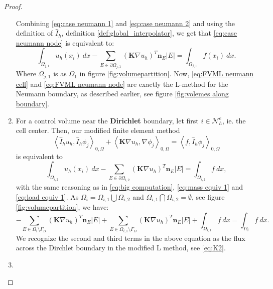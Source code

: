 \documentclass[../Main/main.tex]{subfiles}
\begin{document}
\begin{proof}
\begin{enumerate}
			Combining \eqref{eq:case neumann 1} and \eqref{eq:case neumann 2} and using the definition of $\hat{I}_h$, definition \ref{def:global_interpolator}, we get that \eqref{eq:case neumann node} is equivalent to:
			\begin{equation}\label{eq:FVML neumann node}
				\int_{\Omega_{j,1}}u_h(x_i) \ dx - \sum_{E\in \partial \Omega_{j,1}} (\bm{K}\nabla u_h)^T\bm{n}_E |E| = \int_{\Omega_{j,1}}f(x_i) \ dx.
			\end{equation}
			Where $\Omega_{j,1}$ is as $\Omega_1$ in figure \ref{fig:volumepartition}. Now, \eqref{eq:FVML neumann cell} and \eqref{eq:FVML neumann node} are exactly the L-method for the Neumann boundary, as described earlier, see figure \ref{fig:volemes along boundary}.  
			\item For a control volume near the \textbf{Dirichlet} boundary, let first $i\in \mathcal{N}_h^e$, ie. the cell center. Then, our modified finite element method
			\begin{equation}
				\left \langle \hat{I}_h u_h,\hat{I}_h \phi_j \right \rangle_{0,\Omega} +   \left \langle\bm{K} \nabla u_h,\nabla \phi_j \right \rangle_{0,\Omega} = \left \langle f,\hat{I}_h \phi_j \right \rangle_{0,\Omega}
			\end{equation}   
			is equivalent to 
			\begin{equation} 
				\int_{\Omega_{i,2}} u_h (x_i) \ dx- \sum_{E\in \partial \Omega_{i,2}} (\pmb{K}\nabla u_h)^T\bm{n}_E |E| = \int_{\Omega_{i,2}} f \ dx,
			\end{equation} 
			with the same reasoning as in \eqref{eq:big computation}, \eqref{eq:mass equiv 1} and \eqref{eq:load equiv 1}. As $\Omega_i = \Omega_{i,1}\bigcup \Omega_{i,2}$ and $\Omega_{i,1}\bigcap \Omega_{i,2}= \emptyset$, see figure \ref{fig:volumepartition}, we have:
			\begin{equation}
				-\sum_{E\in \Omega_i \setminus \Gamma_D}(\pmb{K}\nabla u_h)^T\bm{n}_E |E| + \sum_{E\in \Omega_{i,1} \setminus \Gamma_D}(\pmb{K}\nabla u_h)^T\bm{n}_E |E| + \int_{\Omega_{i,1}} f \ dx = \int_{\Omega_i} f \ dx.
			\end{equation}
			We recognize the second and third terms in the above equation as the flux across the Dirchlet boundary in the modified L method, see \eqref{eq:K2}.
			\item {}
		\end{enumerate}
	\end{proof}
\end{document}
